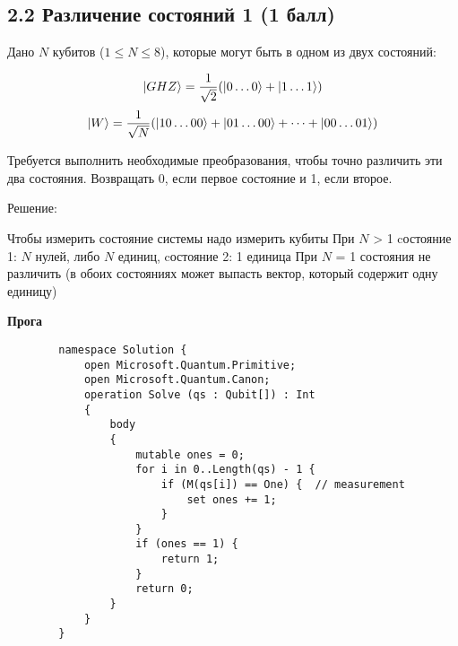 \documentclass{article}
\DeclarePairedDelimiter\ket{\lvert}{\rangle}
\begin{document}
\newpage


\subsection*{2.2 Различение состояний 1 (1 балл)}

    Дано $N$ кубитов ($1 \le N \le 8$), которые могут быть в одном из двух состояний:
    
    $$\ket{GHZ} = \frac{1}{\sqrt2}(\ket{0\dots0} +\ket{1\dots1})$$
    $$\ket{W} = \frac{1}{\sqrt N}(\ket{10\dots00}+\ket{01\dots00} + \dots +\ket{00\dots01})$$
    
    Требуется выполнить необходимые преобразования, чтобы точно различить эти два состояния. Возвращать $0$, если первое состояние и 1, если второе. 
    
    Решение:
        
    \begin{enumerate}
         Чтобы измерить состояние системы надо измерить кубиты
         При $N$ > 1 cостояние 1: $N$ нулей, либо $N$ единиц, cостояние 2: 1 единица
        При $N$ = 1 состояния не различить (в обоих состояниях может выпасть вектор, который содержит одну единицу)

    \end{enumerate}
    
    \textbf{Прога}

    \begin{lstlisting}
        namespace Solution {
            open Microsoft.Quantum.Primitive;
            open Microsoft.Quantum.Canon;
            operation Solve (qs : Qubit[]) : Int 
            {
                body
                {
                    mutable ones = 0;
                    for i in 0..Length(qs) - 1 {
                        if (M(qs[i]) == One) {  // measurement
                            set ones += 1;
                        }
                    }
                    if (ones == 1) {
                        return 1;
                    }
                    return 0;
                }
            }
        }
    \end{lstlisting}
 
    
\end{document}
